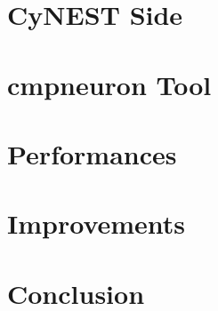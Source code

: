 \documentclass{article}
\begin{document}
\section{CyNEST Side}

\section{cmpneuron Tool}

\section{Performances}

\section{Improvements}

\section{Conclusion}
\end{document}
